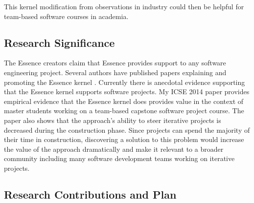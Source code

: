\documentclass[preprint,12pt,3p]{elsarticle}
\begin{document}
This kernel modification from observations in industry could then be helpful for team-based software courses in academia.

\subsection{Research Significance}

The Essence creators claim that Essence provides support to any software engineering project. Several authors have published papers explaining and promoting the Essence kernel \cite{CallToAction, JacobsonQueue, OMGStandard,  AgileSEMAT, EssenceBook, JacobsonMajorLeaugue, JacobsonNewSoftwareEngineering}. Currently there is anecdotal evidence supporting that the Essence kernel  supports software projects. My ICSE 2014 paper provides empirical evidence that the Essence kernel does provides value in the context of master students working on a team-based capstone software project course. 
The paper also shows that the approach's ability to steer iterative projects is decreased during the construction phase. Since projects can spend the majority of their time in construction, discovering a solution to this problem would increase the value of the approach dramatically and make it relevant to a broader community including many software development teams working on iterative projects.

\subsection{Research Contributions and Plan}
\end{document}
